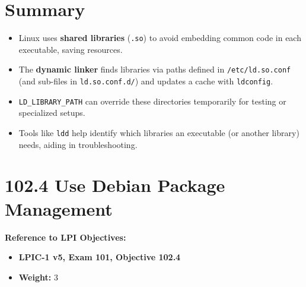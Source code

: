 \documentclass[12pt,a4paper]{report}
\begin{document}
 

\section*{Summary}

\begin{itemize}
    \item Linux uses \textbf{shared libraries} (\texttt{.so}) to avoid embedding common code in each executable, saving resources.  
    \item The \textbf{dynamic linker} finds libraries via paths defined in \texttt{/etc/ld.so.conf} (and sub-files in \texttt{ld.so.conf.d/}) and updates a cache with \texttt{ldconfig}.  
    \item \texttt{LD\_LIBRARY\_PATH} can override these directories temporarily for testing or specialized setups.  
    \item Tools like \texttt{ldd} help identify which libraries an executable (or another library) needs, aiding in troubleshooting.
\end{itemize}










\newpage

\section*{102.4 Use Debian Package Management}

\textbf{Reference to LPI Objectives:}  
\begin{itemize}
    \item \textbf{LPIC-1 v5, Exam 101, Objective 102.4}  
    \item \textbf{Weight:} 3  
\end{itemize}
\end{document}
